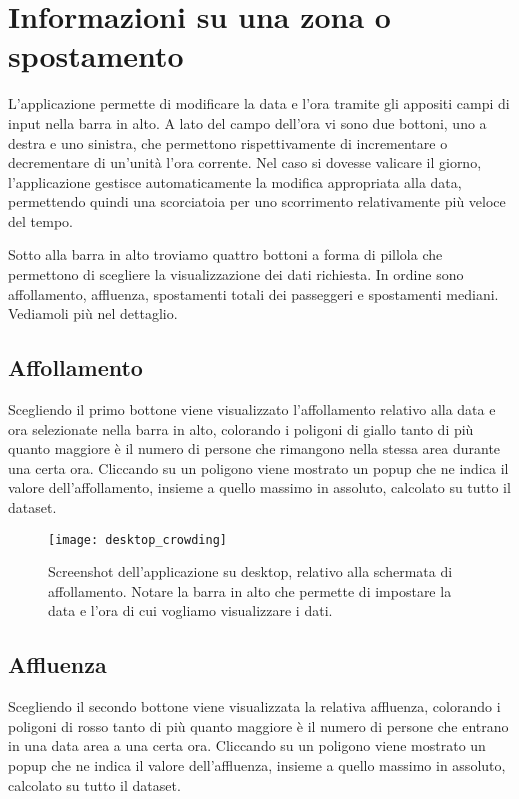 \section{Informazioni su una zona o spostamento}
L'applicazione permette di modificare la data e l'ora tramite gli appositi campi di input nella barra in alto. A lato del campo dell'ora vi sono due bottoni, uno a destra e uno sinistra, che permettono rispettivamente di incrementare o decrementare di un'unità l'ora corrente. Nel caso si dovesse valicare il giorno, l'applicazione gestisce automaticamente la modifica appropriata alla data, permettendo quindi una scorciatoia per uno scorrimento relativamente più veloce del tempo.

Sotto alla barra in alto troviamo quattro bottoni a forma di pillola che permettono di scegliere la visualizzazione dei dati richiesta. In ordine sono affollamento, affluenza, spostamenti totali dei passeggeri e spostamenti mediani. Vediamoli più nel dettaglio.

\subsection{Affollamento}
Scegliendo il primo bottone viene visualizzato l'affollamento relativo alla data e ora selezionate nella barra in alto, colorando i poligoni di giallo tanto di più quanto maggiore è il numero di persone che rimangono nella stessa area durante una certa ora. Cliccando su un poligono viene mostrato un popup che ne indica il valore dell'affollamento, insieme a quello massimo in assoluto, calcolato su tutto il dataset.

\begin{figure}[H]
    \centering
    \texttt{[image: desktop\_crowding]}
    \caption[Screenshot dell'affollamento su desktop]{Screenshot dell'applicazione su desktop, relativo alla schermata di affollamento. Notare la barra in alto che permette di impostare la data e l'ora di cui vogliamo visualizzare i dati.}
    \label{fig:desktop_crowding}
\end{figure}

\subsection{Affluenza}
Scegliendo il secondo bottone viene visualizzata la relativa affluenza, colorando i poligoni di rosso tanto di più quanto maggiore è il numero di persone che entrano in una data area a una certa ora. Cliccando su un poligono viene mostrato un popup che ne indica il valore dell'affluenza, insieme a quello massimo in assoluto, calcolato su tutto il dataset.


